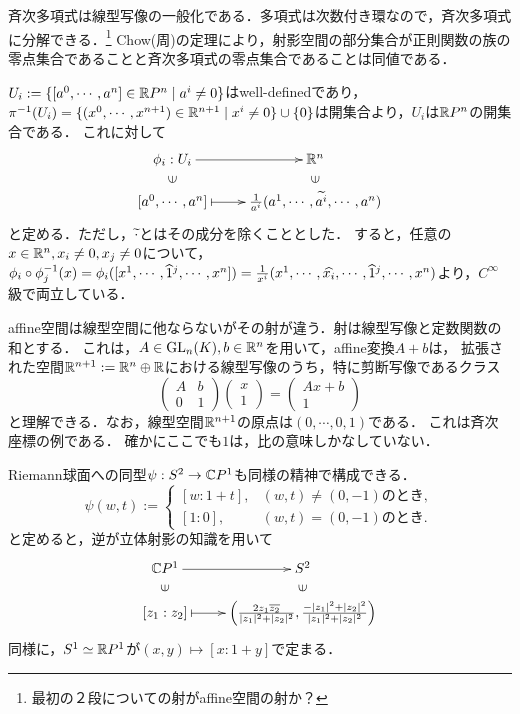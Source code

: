 \documentclass[uplatex,dvipdfmx]{jsreport}
\begin{document}
\begin{tcolorbox}[colframe=ForestGreen, colback=ForestGreen!10!white,breakable,colbacktitle=ForestGreen!40!white,coltitle=black,fonttitle=\bfseries\sffamily,
title=]
    斉次多項式は線型写像の一般化である．多項式は次数付き環なので，斉次多項式に分解できる．\footnote{最初の２段についての射がaffine空間の射か？}
    Chow(周)の定理により，射影空間の部分集合が正則関数の族の零点集合であることと斉次多項式の零点集合であることは同値である．
\end{tcolorbox}

\begin{definition}
    $U_i:=\{[a^0,\cdots,a^n]\in\mathbb{R} P^n\mid a^i\ne 0\}$はwell-definedであり，$\pi^{-1}(U_i)=\{(x^0,\cdots,x^{n+1})\in\mathbb{R}^{n+1}\mid x^i\ne 0\}\cup\{0\}$は開集合より，$U_i$は$\mathbb{R} P^n$の開集合である．
    これに対して
    \[\xymatrix@R-2pc{
        \phi_i:U_i\ar[r]&\R^n\\
        \rotatebox[origin=c]{90}{$\in$}&\rotatebox[origin=c]{90}{$\in$}\\
        [a^0,\cdots,a^n]\ar@{|->}[r]&\frac{1}{a^i}(a^1,\cdots,\wt{a^i},\cdots,a^n)
    }\]
    と定める．ただし，$\widetilde{\cdot}$とはその成分を除くこととした．
    すると，任意の$x\in\mathbb{R}^n,x_i\ne 0,x_j\ne 0$について，$\phi_i\circ\phi_j^{-1}(x)=\phi_i([x^1,\cdots,\widehat{1}^j,\cdots,x^n])=\frac{1}{x^i}(x^1,\cdots,\widehat{x_i},\cdots,\widehat{1}^j,\cdots,x^n)$より，$C^\infty$級で両立している．
\end{definition}
\begin{remarks}[斉次座標の例とRiemann球面との同型]
    affine空間は線型空間に他ならないがその射が違う．射は線型写像と定数関数の和とする．
    これは，$A\in\mathrm{GL}_{n}(K),b\in\mathbb{R}^n$を用いて，affine変換$A+b$は，
    拡張された空間$\mathbb{R}^{n+1}:=\mathbb{R}^n\oplus\mathbb{R}$における線型写像のうち，特に剪断写像であるクラス
    \[
        \begin{pmatrix}A&b\\0&1\end{pmatrix}\begin{pmatrix}x\\1\end{pmatrix}=\begin{pmatrix}Ax+b\\1\end{pmatrix}
    \]
    と理解できる．なお，線型空間$\mathbb{R}^{n+1}$の原点は$(0,\cdots,0,1)$である．
    これは斉次座標の例である．
    確かにここでも$1$は，比の意味しかなしていない．

    Riemann球面への同型$\psi:S^2\to\mathbb{C} P^1$も同様の精神で構成できる．
    \[\psi(w,t):=\begin{cases}
        [w:1+t],&(w,t)\ne(0,-1)のとき,\\
        [1:0],&(w,t)=(0,-1)のとき.
    \end{cases}\]
    と定めると，逆が立体射影の知識を用いて
    \[\xymatrix@R-2pc{
        \C P^1\ar[r]&S^2\\
        \rotatebox[origin=c]{90}{$\in$}&\rotatebox[origin=c]{90}{$\in$}\\
        [z_1:z_2]\ar@{|->}[r]&\paren{\frac{2z_1\o{z_2}}{\abs{z_1}^2+\abs{z_2}^2},\frac{-\abs{z_1}^2+\abs{z_2}^2}{\abs{z_1}^2+\abs{z_2}^2}}
    }\]
    同様に，$S^1\simeq\mathbb{R} P^1$が$(x,y)\mapsto[x:1+y]$で定まる．
\end{remarks}
\end{document}
